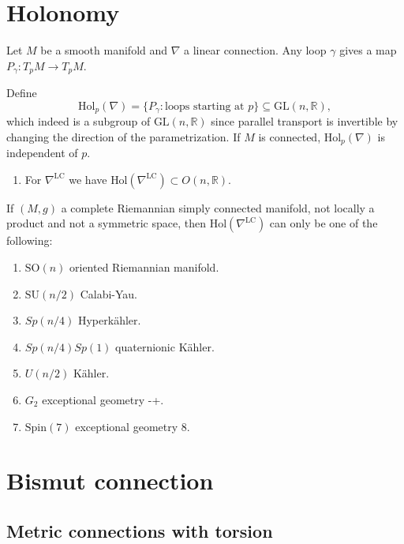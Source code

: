 \section{Holonomy}
\label{section-holonomy}

\noindent
Let $M$ be a smooth manifold
and $\nabla$ a linear connection.
Any loop $\gamma$ gives a map
$P_\gamma:T_pM \to T_pM$.

Define
$$
\text{Hol}_p(\nabla)
=\{P_\gamma:\text{loops starting at }p\}
\subseteq \text{GL}(n,\mathbb{R}),
$$
which indeed is a subgroup of
$\text{GL}(n,\mathbb{R})$
since parallel transport is invertible
by changing the direction of the
parametrization.
If $M$ is connected, $\text{Hol}_p(\nabla)$
is independent of $p$.

\begin{example}
\label{example-holonomy}
\begin{enumerate}
\item For $\nabla^{\text{LC}}$
we have $\text{Hol}(\nabla^{\text{LC}})
\subset O(n,\mathbb{R})$.

\end{enumerate}
\end{example}

\begin{theorem}[Berger, 1955]
\label{theorem-berger}
If $(M,g)$ a complete Riemannian
simply connected
manifold,
not locally a product
and not a symmetric space,
then $\text{Hol}(\nabla^{\text{LC}})$
can only be one of the following:
\begin{enumerate}
\item $\text{SO}(n)$ oriented Riemannian
manifold.
\item $\text{SU}(n/2)$ Calabi-Yau.
\item $Sp(n/4)$ Hyperkähler.
\item $Sp(n/4)Sp(1)$ quaternionic Kähler.
\item $U(n/2)$ Kähler.
\item $G_2$ exceptional geometry -+.
\item $\text{Spin}(7)$ exceptional
geometry 8.
\end{enumerate}
\end{theorem}

\section{Bismut connection}
\label{section-bistmuth}

\subsection{Metric connections with torsion}
\label{subsection-connections-with-torsion}

